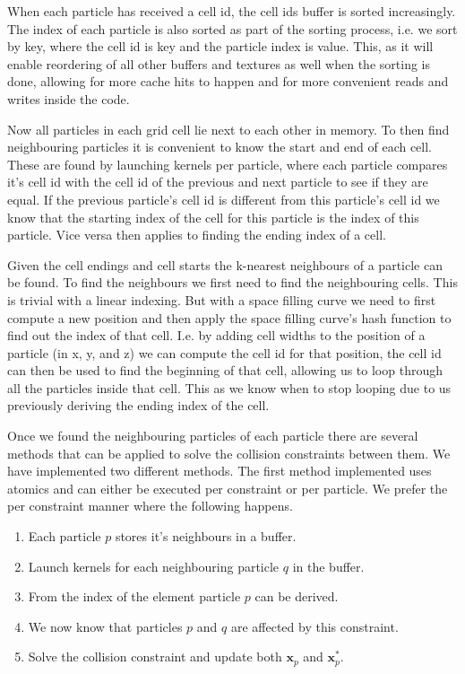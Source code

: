 When each particle has received a cell id, the cell ids buffer is sorted
increasingly. The index of each particle is also sorted as part of the sorting
process, i.e. we sort by key, where the cell id is key and the particle index
is value. This, as it will enable reordering of all other buffers and textures
as well when the sorting is done, allowing for more cache hits to happen and
for more convenient reads and writes inside the code.

Now all particles in each grid cell lie next to each other in memory. To then
find neighbouring particles it is convenient to know the start and end of each
cell. These are found by launching kernels per particle, where each particle
compares it's cell id with the cell id of the previous and next particle to see
if they are equal. If the previous particle's cell id is different from this
particle's cell id we know that the starting index of the cell for this
particle is the index of this particle. Vice versa then applies to finding the
ending index of a cell.

Given the cell endings and cell starts the k-nearest neighbours of a particle
can be found. To find the neighbours we first need to find the neighbouring
cells. This is trivial with a linear indexing. But with a space filling curve
we need to first compute a new position and then apply the space filling
curve's hash function to find out the index of that cell. I.e. by adding cell
widths to the position of a particle (in x, y, and z) we can compute the cell
id for that position, the cell id can then be used to find the beginning of
that cell, allowing us to loop through all the particles inside that cell. This
as we know when to stop looping due to us previously deriving the ending index
of the cell.

Once we found the neighbouring particles of each particle there are several
methods that can be applied to solve the collision constraints between them. We
have implemented two different methods. The first method implemented uses
atomics and can either be executed per constraint or per particle. We prefer
the per constraint manner where the following happens.

\begin{enumerate}
\item Each particle $p$ stores it's neighbours in a buffer.
\item Launch kernels for each neighbouring particle $q$ in the buffer.
\item From the index of the element particle $p$ can be derived.
\item We now know that particles $p$ and $q$ are affected by this constraint.
\item Solve the collision constraint and update both $\mathbf{x}_{p}$ and $\mathbf{x}_{p}^{*}$.
\end{enumerate}

